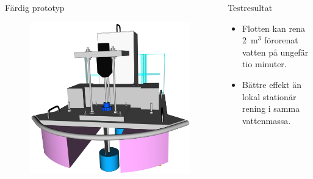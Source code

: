 \documentclass[final]{beamer}
\newlength{\onecolwid}
\begin{document}
\begin{frame}[t]
\begin{columns}[t, totalwidth=\textwidth]
\begin{column}{\onecolwid}
\begin{block}{Färdig prototyp}
        \vskip 8cm
        \begin{figure}[H]
          \centering
          \hbox{\hspace{-3cm}\includegraphics[width=25cm]{figures/front_rbr.png}}
        \end{figure}
      \end{block}

    \end{column}
    \begin{column}{\onecolwid}

      \begin{block}{Testresultat}
        \begin{itemize}
        \item Flotten kan rena 2~m$^3$ förorenat vatten på ungefär tio minuter.
        \item Bättre effekt än lokal stationär rening i samma vattenmassa.
        \end{itemize}


\end{block}
\end{column}
\end{columns}
\end{frame}
\end{document}
